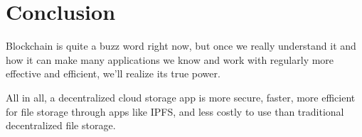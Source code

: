 \section{Conclusion}

Blockchain is quite a buzz word right now, but once we really understand it and how it can make many applications we know and work with regularly more effective and efficient, we’ll realize its true power.

All in all, a decentralized cloud storage app is more secure, faster, more efficient for file storage through apps like IPFS, and less costly to use than traditional decentralized file storage.
